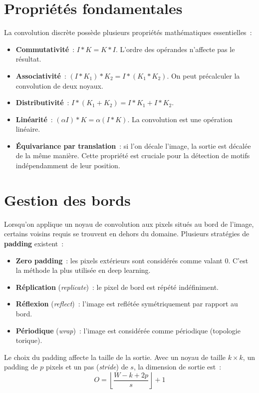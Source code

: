\documentclass[a4paper,11pt,twoside]{book}
\begin{document}
\section{Propriétés fondamentales}

La convolution discrète possède plusieurs propriétés mathématiques essentielles~:

\begin{itemize}[leftmargin=2em]
  \item \textbf{Commutativité}~: $I * K = K * I$. L'ordre des opérandes n'affecte pas le résultat.
  \item \textbf{Associativité}~: $(I * K_1) * K_2 = I * (K_1 * K_2)$. On peut précalculer la convolution de deux noyaux.
  \item \textbf{Distributivité}~: $I * (K_1 + K_2) = I * K_1 + I * K_2$.
  \item \textbf{Linéarité}~: $(\alpha I) * K = \alpha (I * K)$. La convolution est une opération linéaire.
  \item \textbf{Équivariance par translation}~: si l'on décale l'image, la sortie est décalée de la même manière. Cette propriété est cruciale pour la détection de motifs indépendamment de leur position.
\end{itemize}

\section{Gestion des bords}

Lorsqu'on applique un noyau de convolution aux pixels situés au bord de l'image, certains voisins requis se trouvent en dehors du domaine. Plusieurs stratégies de \textbf{padding} existent~:

\begin{itemize}[leftmargin=2em]
  \item \textbf{Zero padding}~: les pixels extérieurs sont considérés comme valant 0. C'est la méthode la plus utilisée en deep learning.
  \item \textbf{Réplication} (\textit{replicate})~: le pixel de bord est répété indéfiniment.
  \item \textbf{Réflexion} (\textit{reflect})~: l'image est reflétée symétriquement par rapport au bord.
  \item \textbf{Périodique} (\textit{wrap})~: l'image est considérée comme périodique (topologie torique).
\end{itemize}

Le choix du padding affecte la taille de la sortie. Avec un noyau de taille $k \times k$, un padding de $p$ pixels et un pas (\textit{stride}) de $s$, la dimension de sortie est~:
\[
O = \left\lfloor \frac{W - k + 2p}{s} \right\rfloor + 1
\]
\end{document}
